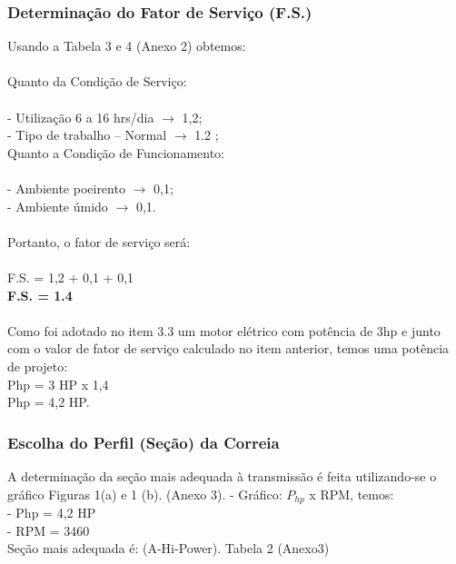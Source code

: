 \documentclass[a4paper, 11pt]{article}
\begin{document}
\subsubsection{Determina\c{c}\~ao do Fator de Servi\c{c}o (F.S.)}
Usando a Tabela 3 e 4 (Anexo 2) obtemos:\\\\
Quanto da Condi\c{c}\~ao de Servi\c{c}o:\\\\
- Utiliza\c{c}\~ao 6 a 16 hrs/dia $\rightarrow$ 1,2;\\
- Tipo de trabalho – Normal $\rightarrow$ 1.2 ;\\
Quanto a Condi\c{c}\~ao de Funcionamento:\\\\
- Ambiente poeirento $\rightarrow$ 0,1;\\
- Ambiente úmido $\rightarrow$ 0,1.\\\\
Portanto, o fator de servi\c{c}o ser\'a:\\\\
F.S. = 1,2 + 0,1 + 0,1\\
\textbf{F.S. = 1.4}\\\\
Como foi adotado no item 3.3 um motor el\'etrico com pot\^encia de 3hp e
junto com o valor de fator de servi\c{c}o calculado no item anterior, temos uma
pot\^encia de projeto:\\
Php = 3 HP x 1,4\\
Php = 4,2 HP.\\
\subsubsection{Escolha do Perfil (Se\c{c}\~ao) da Correia}
A determina\c{c}\~ao da se\c{c}\~ao mais adequada à transmiss\~ao \'e feita utilizando-se
o gr\'afico Figuras 1(a) e 1 (b). (Anexo 3).
- Gr\'afico: $P_{hp}$ x RPM, temos:\\
- Php = 4,2 HP\\
- RPM = 3460\\
Se\c{c}\~ao mais adequada \'e: (A-Hi-Power). Tabela 2 (Anexo3)
\end{document}
